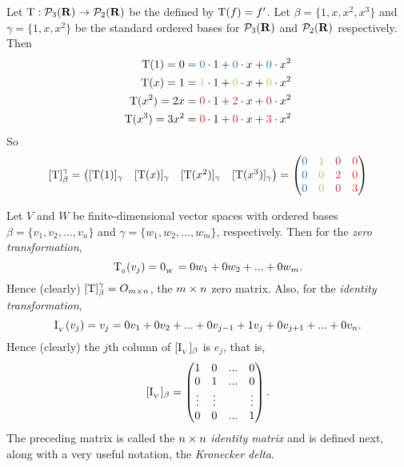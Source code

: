 \begin{example} \label{example 2.2.4}
Let \(\mathrm{T} : \mathcal{P}_3(\mathbf{R}) \to \mathcal{P}_2(\mathbf{R})\) be the \LTRAN{} defined by \(\mathrm{T}(f) = f'\).
Let \(\beta = \{ 1, x, x^2, x^3 \}\) and \(\gamma = \{ 1, x, x^2 \}\) be the standard ordered bases for \(\mathcal{P}_3(\mathbf{R})\) and \(\mathcal{P}_2(\mathbf{R})\)
respectively.
Then
\begin{align*}
         \T(1) = 0 & = \BLUE{0} \cdot 1 + \BLUE{0} \cdot x + \BLUE{0} \cdot x^2 \\
         \T(x) = 1 & = \GREEN{1} \cdot 1 + \GREEN{0} \cdot x + \GREEN{0} \cdot x^2 \\
      \T(x^2) = 2x & = \MAROON{0} \cdot 1 + \MAROON{2} \cdot x + \MAROON{0} \cdot x^2 \\
    \T(x^3) = 3x^2 & = \RED{0} \cdot 1 + \RED{0} \cdot x + \RED{3} \cdot x^2
\end{align*}
So
\[
    [\T]_{\beta}^{\gamma}
    = \begin{pmatrix}
     [\T(1)]_{\gamma} & [\T(x)]_{\gamma} & [\T(x^2)]_{\gamma} & [\T(x^3)]_{\gamma}
    \end{pmatrix}
    = \begin{pmatrix}
        \BLUE{0} & \GREEN{1} & \MAROON{0} & \RED{0} \\
        \BLUE{0} & \GREEN{0} & \MAROON{2} & \RED{0} \\
        \BLUE{0} & \GREEN{0} & \MAROON{0} & \RED{3}
    \end{pmatrix}
\]
\end{example}

\begin{additional definition} \label{adef}
Let \(V\) and \(W\) be finite-dimensional vector spaces with ordered bases \(\beta = \{ v_1, v_2, ..., v_n \}\) and \(\gamma = \{ w_1, w_2, ..., w_m \}\), respectively.
Then for the \emph{zero transformation},
\[
    \mathrm{T}_{_0}(v_j) = 0_{_W} = 0 w_1 + 0 w_2 + ... + 0 w_m.
\]
Hence (clearly) \([\mathrm{T}]_{\beta}^{\gamma} = O_{m \times n}\), the \(m \times n\) zero matrix.
Also, for the \emph{identity transformation},
\[
\mathrm{I}_{_V}(v_j) = v_j = 0v_1 + 0v_2 + ... + 0v_{j - 1} + 1 v_j + 0 v_{j + 1} + ... + 0v_n.
\]
Hence (clearly) the \(j\)th column of \([\mathrm{I}_{_V}]_{\beta}\) is \(e_j\), that is,
\[
    [\mathrm{I}_{_V}]_{\beta} = \begin{pmatrix}
        1 & 0 & ... & 0 \\
        0 & 1 & ... & 0 \\
        \vdots & \vdots & & \vdots \\
        0 & 0 & ... & 1
    \end{pmatrix}.
\]
The preceding matrix is called the \(n \times n\) \emph{identity matrix} and is defined next, along with a very useful notation, the \emph{Kronecker delta}.
\end{additional definition}

